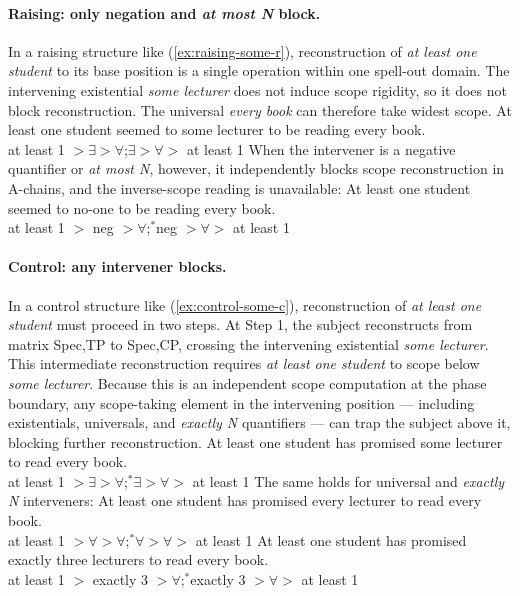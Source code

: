 \documentclass[12pt]{article}
\begin{document}
\paragraph{Raising: only negation and \emph{at most N} block.} In a raising structure like (\ref{ex:raising-some-r}), reconstruction of \emph{at least one student} to its base position is a single operation within one spell-out domain. The intervening existential \emph{some lecturer} does not induce scope rigidity, so it does not block reconstruction. The universal \emph{every book} can therefore take widest scope.
%
\ex\label{ex:raising-some-r}
At least one student seemed to some lecturer to be reading every book.\\
at least 1 $> \exists > \forall$;\quad $\exists > \forall >$ at least 1
\xe
%
When the intervener is a negative quantifier or \emph{at most N}, however, it independently blocks scope reconstruction in A-chains, and the inverse-scope reading is unavailable:
%
\ex\label{ex:raising-neg-r}
At least one student seemed to no-one to be reading every book.\\
at least 1 $>$ neg $> \forall$;\quad $^*$neg $> \forall >$ at least 1
\xe

\paragraph{Control: any intervener blocks.} In a control structure like (\ref{ex:control-some-c}), reconstruction of \emph{at least one student} must proceed in two steps. At Step 1, the subject reconstructs from matrix Spec,TP to Spec,CP, crossing the intervening existential \emph{some lecturer}. This intermediate reconstruction requires \emph{at least one student} to scope below \emph{some lecturer}. Because this is an independent scope computation at the phase boundary, any scope-taking element in the intervening position --- including existentials, universals, and \emph{exactly N} quantifiers --- can trap the subject above it, blocking further reconstruction.
%
\ex\label{ex:control-some-c}
At least one student has promised some lecturer to read every book.\\
at least 1 $> \exists > \forall$;\quad $^*\exists > \forall >$ at least 1
\xe
%
The same holds for universal and \emph{exactly N} interveners:
%
\pex\label{ex:control-others}
\a At least one student has promised every lecturer to read every book.\\
at least 1 $> \forall > \forall$;\quad $^*\forall > \forall >$ at least 1
\a At least one student has promised exactly three lecturers to read every book.\\
at least 1 $>$ exactly 3 $> \forall$;\quad $^*$exactly 3 $> \forall >$ at least 1
\xe
\end{document}
